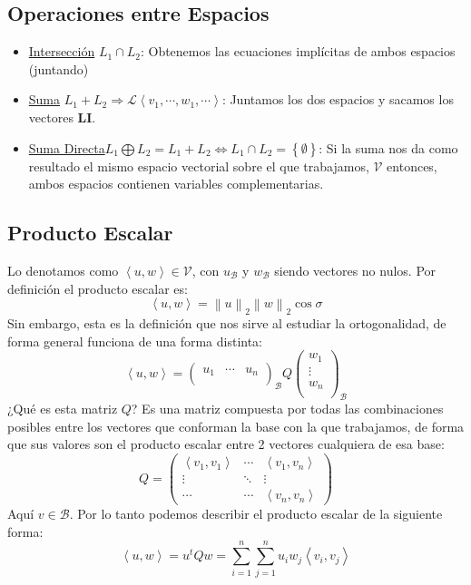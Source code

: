 \subsection{Operaciones entre Espacios}
\begin{itemize}
        \item \underline{Intersección} \(L_1 \cap  L_2 \):  Obtenemos las ecuaciones implícitas de ambos espacios (juntando)
        \item \underline{Suma} \(L_1 +  L_2 \Rightarrow \mathcal{L}\left\langle v_1,\cdots,w_1,\cdots\right\rangle \):   Juntamos los dos espacios y sacamos los vectores \textbf{LI}.
        \item \underline{Suma Directa}\(L_1 \bigoplus  L_2 = L_1 + L_2 \Leftrightarrow L_1 \cap  L_2 = \left\{\emptyset\right\} \): Si la suma nos da como resultado el mismo espacio vectorial sobre el que trabajamos, \(\mathcal{V}\) entonces, ambos espacios contienen variables complementarias.
\end{itemize}
\subsection{Producto Escalar}
Lo denotamos como \(\left\langle u,w\right\rangle  \in \mathcal{V}\), con \(u_\mathcal{B}\) y \(w_\mathcal{B}\) siendo vectores no nulos. Por definición el producto escalar es:
\[
        \boxed{\left\langle u,w\right\rangle = \left\lVert u\right\rVert_2 \left\lVert w\right\rVert_2 \cos{\sigma} }
\]
Sin embargo, esta es la definición que nos sirve al estudiar la ortogonalidad, de forma general funciona de una forma distinta:
\[
        \boxed{\left\langle u,w\right\rangle =
                \begin{pmatrix}
                        u_1 & \cdots & u_n \\
                \end{pmatrix}_\mathcal{B}
                Q
                \begin{pmatrix}
                        w_1    \\
                        \vdots \\
                        w_n    \\
                \end{pmatrix}}_\mathcal{B}
\]
¿Qué es esta matriz \(Q\)? Es una matriz compuesta por todas las combinaciones posibles entre los vectores que conforman la base con la que trabajamos, de forma que sus valores son el producto escalar entre 2 vectores cualquiera de esa base:
\[
        Q = \begin{pmatrix}
                \left\langle v_1,v_1\right\rangle & \cdots & \left\langle v_1,v_n\right\rangle  \\
                \vdots                            & \ddots & \vdots                             \\
                \cdots                            & \cdots & \left\langle v_n, v_n\right\rangle
        \end{pmatrix}
\]
Aquí \(v \in \mathcal{B}\). Por lo tanto podemos describir el producto escalar de la siguiente forma:
\[
        \boxed{\left\langle u,w\right\rangle = u^t Q w = \sum^n_{i=1} \sum_{j=1}^n u_i w_j \left\langle v_i,v_j\right\rangle}
\]
